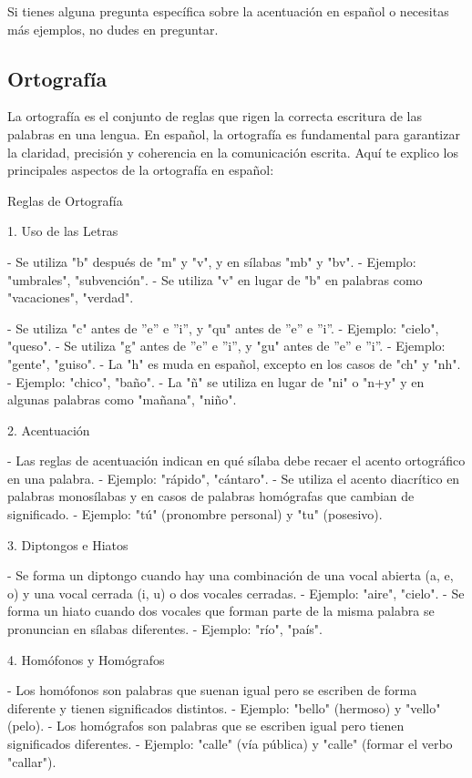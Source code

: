 Si tienes alguna pregunta específica sobre la acentuación en español o necesitas más ejemplos, no dudes en preguntar.

\subsection{Ortografía}

La ortografía es el conjunto de reglas que rigen la correcta escritura de las palabras en una lengua. En español, la ortografía es fundamental para garantizar la claridad, precisión y coherencia en la comunicación escrita. Aquí te explico los principales aspectos de la ortografía en español:

 Reglas de Ortografía

 1. Uso de las Letras

- Se utiliza "b" después de "m" y "v", y en sílabas "mb" y "bv".
  - Ejemplo: "umbrales", "subvención".
- Se utiliza "v" en lugar de "b" en palabras como "vacaciones", "verdad".

- Se utiliza "c" antes de ''e'' e ''i'', y "qu" antes de ''e'' e ''i''.
  - Ejemplo: "cielo", "queso".
- Se utiliza "g" antes de ''e'' e ''i'', y "gu" antes de ''e'' e ''i''.
  - Ejemplo: "gente", "guiso".
- La "h" es muda en español, excepto en los casos de "ch" y "nh".
  - Ejemplo: "chico", "baño".
- La "ñ" se utiliza en lugar de "ni" o "n+y" y en algunas palabras como "mañana", "niño".

2. Acentuación

- Las reglas de acentuación indican en qué sílaba debe recaer el acento ortográfico en una palabra.
  - Ejemplo: "rápido", "cántaro".
- Se utiliza el acento diacrítico en palabras monosílabas y en casos de palabras homógrafas que cambian de significado.
  - Ejemplo: "tú" (pronombre personal) y "tu" (posesivo).

 3. Diptongos e Hiatos

- Se forma un diptongo cuando hay una combinación de una vocal abierta (a, e, o) y una vocal cerrada (i, u) o dos vocales cerradas.
  - Ejemplo: "aire", "cielo".
- Se forma un hiato cuando dos vocales que forman parte de la misma palabra se pronuncian en sílabas diferentes.
  - Ejemplo: "río", "país".

 4. Homófonos y Homógrafos

- Los homófonos son palabras que suenan igual pero se escriben de forma diferente y tienen significados distintos.
  - Ejemplo: "bello" (hermoso) y "vello" (pelo).
- Los homógrafos son palabras que se escriben igual pero tienen significados diferentes.
  - Ejemplo: "calle" (vía pública) y "calle" (formar el verbo "callar").

